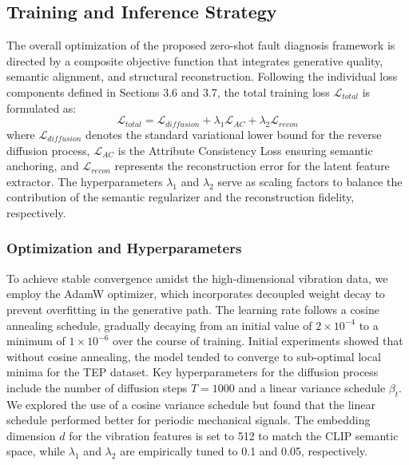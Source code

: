 \subsection{Training and Inference Strategy}

The overall optimization of the proposed zero-shot fault diagnosis framework is directed by a composite objective function that integrates generative quality, semantic alignment, and structural reconstruction. Following the individual loss components defined in Sections 3.6 and 3.7, the total training loss $\mathcal{L}_{total}$ is formulated as:
\begin{equation}
\mathcal{L}_{total} = \mathcal{L}_{diffusion} + \lambda_1 \mathcal{L}_{AC} + \lambda_2 \mathcal{L}_{recon}
\end{equation}
where $\mathcal{L}_{diffusion}$ denotes the standard variational lower bound for the reverse diffusion process, $\mathcal{L}_{AC}$ is the Attribute Consistency Loss ensuring semantic anchoring, and $\mathcal{L}_{recon}$ represents the reconstruction error for the latent feature extractor. The hyperparameters $\lambda_1$ and $\lambda_2$ serve as scaling factors to balance the contribution of the semantic regularizer and the reconstruction fidelity, respectively.

\subsubsection{Optimization and Hyperparameters}
To achieve stable convergence amidst the high-dimensional vibration data, we employ the AdamW optimizer, which incorporates decoupled weight decay to prevent overfitting in the generative path. The learning rate follows a cosine annealing schedule, gradually decaying from an initial value of $2 \times 10^{-4}$ to a minimum of $1 \times 10^{-6}$ over the course of training. Initial experiments showed that without cosine annealing, the model tended to converge to sub-optimal local minima for the TEP dataset. Key hyperparameters for the diffusion process include the number of diffusion steps $T=1000$ and a linear variance schedule $\beta_t$. We explored the use of a cosine variance schedule but found that the linear schedule performed better for periodic mechanical signals. The embedding dimension $d$ for the vibration features is set to 512 to match the CLIP semantic space, while $\lambda_1$ and $\lambda_2$ are empirically tuned to 0.1 and 0.05, respectively.

